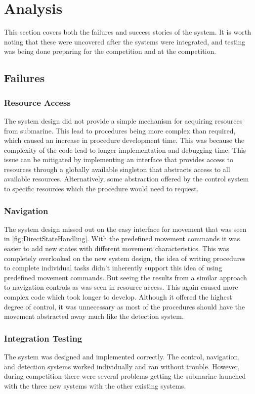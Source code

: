 \chapter{Analysis}

\label{Chapter4}

This section covers both the failures and success stories of the system. It is worth noting that these were uncovered after the systems were integrated, and testing was being done preparing for the competition and at the competition.

\section{Failures}

\subsection{Resource Access}
The system design did not provide a simple mechanism for acquiring resources from submarine. This lead to procedures being more complex than required, which caused an increase in procedure development time. This was because the complexity of the code lead to longer implementation and debugging time. This issue can be mitigated by implementing an interface that provides access to resources through a globally available singleton that abstracts access to all available resources. Alternatively, some abstraction offered by the control system to specific resources which the procedure would need to request.

\subsection{Navigation}
The system design missed out on the easy interface for movement that was seen in \ref{fig:DirectStateHandling}. With the predefined movement commands it was easier to add new states with different movement characteristics. This was completely overlooked on the new system design, the idea of writing procedures to complete individual tasks didn't inherently support this idea of using predefined movement commands. But seeing the results from a similar approach to navigation controls as was seen in resource access. This again caused more complex code which took longer to develop. Although it offered the highest degree of control, it was unnecessary as most of the procedures should have the movement abstracted away much like the detection system.

\subsection{Integration Testing}
The system was designed and implemented correctly. The control, navigation, and
detection systems worked individually and ran without trouble. However, during
competition there were several problems getting the submarine launched with the
three new systems with the other existing systems.

